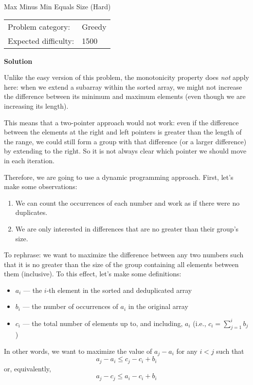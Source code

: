 \documentclass [11pt, a4paper] {article}
\begin{document}
\begin{tutorial}{Max Minus Min Equals Size (Hard)}
  
  \begin{tabular}{ll}
    Problem category:    & Greedy \\
    Expected difficulty: & 1500
  \end{tabular}
  
  \textbf{Solution}
  
  Unlike the easy version of this problem, the monotonicity property does \textit{not} apply here: when we extend a subarray within the sorted array, we might not increase the difference between its minimum and maximum elements (even though we are increasing its length).
  
  This means that a two-pointer approach would not work: even if the difference between the elements at the right and left pointers is greater than the length of the range, we could still form a group with that difference (or a larger difference) by extending to the right. So it is not always clear which pointer we should move in each iteration.
  
  Therefore, we are going to use a dynamic programming approach. First, let's make some observations:
  
  \begin{enumerate}
    \item We can count the occurrences of each number and work as if there were no duplicates.
    \item We are only interested in differences that are no greater than their group's size.
  \end{enumerate}
  
  To rephrase: we want to maximize the difference between any two numbers such that it is no greater than the size of the group containing all elements between them (inclusive). To this effect, let's make some definitions:
  
  \begin{itemize}
    \item $a_i$ --- the $i$-th element in the sorted and deduplicated array
    \item $b_i$ --- the number of occurrences of $a_i$ in the original array
    \item $c_i$ --- the total number of elements up to, and including, $a_i$ (i.e., $ c_i = \sum_{j=1}^{i} b_j $)
  \end{itemize}
  
  In other words, we want to maximize the value of $a_j - a_i$ for any $i < j$ such that $$ a_j - a_i \le c_j - c_i + b_i $$ or, equivalently, $$ a_j - c_j \le a_i - c_i + b_i $$
  

\end{tutorial}
\end{document}
